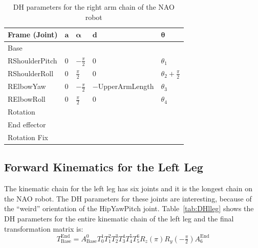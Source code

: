\begin{table}[!t]
\centering
\caption{DH parameters for the right arm chain of the NAO robot}
\label{tab:DHrarm}
\begin{tabular}{|l|>{\centering\arraybackslash}m{2.55cm}|>{\centering\arraybackslash}m{2.55cm}|>{\centering\arraybackslash}m{2.85cm}|>{\centering\arraybackslash}m{2.55cm}|}
\hline
\textbf{Frame (Joint)} & $\mathbf{a}$ & $\boldsymbol{\alpha}$ & $\mathbf{d}$ & $\boldsymbol{\theta}$\\ \hline
Base & \multicolumn{4}{c|}{$A(0,\text{\footnotesize{$-$ShoulderOffsetY $-$ ElbowOffsetY}},\text{\footnotesize{ShoulderOffsetZ}})$} \\ \hline
RShoulderPitch & $0$ & $-\frac{\pi}{2}$ & $0$ & $\theta_1$ \\ \hline
RShoulderRoll & $0$ & $\frac{\pi}{2}$ & $0$ & $\theta_2 + \frac{\pi}{2}$ \\ \hline
RElbowYaw & $0$ & $-\frac{\pi}{2}$ & \footnotesize{$-$UpperArmLength} & $\theta_3$ \\ \hline
RElbowRoll & $0$ & $\frac{\pi}{2}$ & $0$ & $\theta_4$ \\ \hline
Rotation & \multicolumn{4}{c|}{$R_z(\frac{\pi}{2})$} \\ \hline
End effector & \multicolumn{4}{c|}{$A(\text{\footnotesize{$-$HandOffsetX $-$ LowerArmLength}},0,0)$} \\ \hline
Rotation Fix & \multicolumn{4}{c|}{$R_z(-\pi)$} \\ \hline
\end{tabular}
\end{table}



\subsection{Forward Kinematics for the Left Leg}
The kinematic chain for the left leg has six joints and it is the longest chain on the NAO robot. The DH parameters for these joints are interesting, because of the ``weird'' orientation of the HipYawPitch joint. Table~\ref{tab:DHlleg} shows the DH parameters for the entire kinematic chain of the left leg and the final transformation matrix is:
\[
T^\text{End}_\text{Base} = A^0_\text{Base}T^1_0T^2_1T^3_2T^4_3T^5_4T^6_5R_z(\pi)R_y(-\tfrac{\pi}{2})A^\text{End}_{6}
\]

